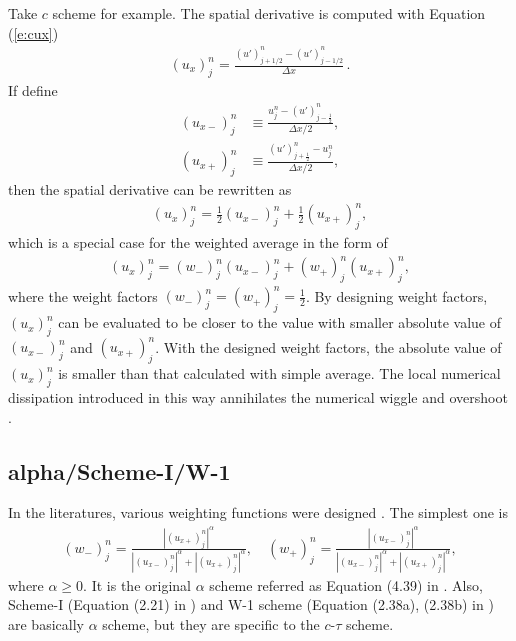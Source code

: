 \documentclass[11pt,dvips]{article}
\numberwithin{equation}{section}
\begin{document}
Take $c$ scheme for example.  The spatial derivative is computed with Equation
(\ref{e:cux})
\begin{align*}
  (u_x)_j^n = \frac{(u')_{j+1/2}^n - (u')_{j-1/2}^n}{\Delta x}\,.
\end{align*}
If define
\begin{align}
  (u_{x-})_j^n &\equiv
    \frac{u_j^n - (u')_{j-\frac{1}{2}}^n}{\Delta x/2}, \label{e:ux-} \\
  (u_{x+})_j^n &\equiv
    \frac{(u')_{j+\frac{1}{2}}^n - u_j^n}{\Delta x/2}, \label{e:ux+}
\end{align}
then the spatial derivative can be rewritten as
\begin{align*}
  (u_x)_j^n = \frac{1}{2}(u_{x-})_j^n + \frac{1}{2}(u_{x+})_j^n,
\end{align*}
which is a special case for the weighted average in the form of
\begin{align}
  (u_x)_j^n = (w_-)_j^n(u_{x-})_j^n + (w_+)_j^n(u_{x+})_j^n
    , \label{e:weighting}
\end{align}
where the weight factors $(w_-)_j^n=(w_+)_j^n=\frac{1}{2}$.  By designing
weight factors, $(u_x)_j^n$ can be evaluated to be closer to the value with
smaller absolute value of $(u_{x-})_j^n$ and $(u_{x+})_j^n$.  With the designed
weight factors, the absolute value of $(u_x)_j^n$ is smaller than that
calculated with simple average.  The local numerical dissipation introduced in
this way annihilates the numerical wiggle and
overshoot \citep{chang_multi-dimensional_2003}.

\subsection{alpha/Scheme-I/W-1}

In the literatures, various weighting functions were
designed \citep{chang_method_1995, chang_courant_2002,
chang_multi-dimensional_2003}.  The simplest one is
\begin{align}
  (w_-)_j^n =
    \frac{|(u_{x+})_j^n|^{\alpha}}
         {|(u_{x-})_j^n|^{\alpha}+|(u_{x+})_j^n|^{\alpha}}, \quad
  (w_+)_j^n =
    \frac{|(u_{x-})_j^n|^{\alpha}}
         {|(u_{x-})_j^n|^{\alpha}+|(u_{x+})_j^n|^{\alpha}}, \label{e:alpha}
\end{align}
where $\alpha\ge0$.  It is the original $\alpha$ scheme referred as Equation
(4.39) in \citep{chang_method_1995}.  Also, Scheme-I (Equation (2.21) in
\citep{chang_courant_2002}) and W-1 scheme (Equation (2.38a), (2.38b) in
\citep{chang_multi-dimensional_2003}) are basically $\alpha$ scheme, but they
are specific to the $c$-$\tau$ scheme.
\end{document}
